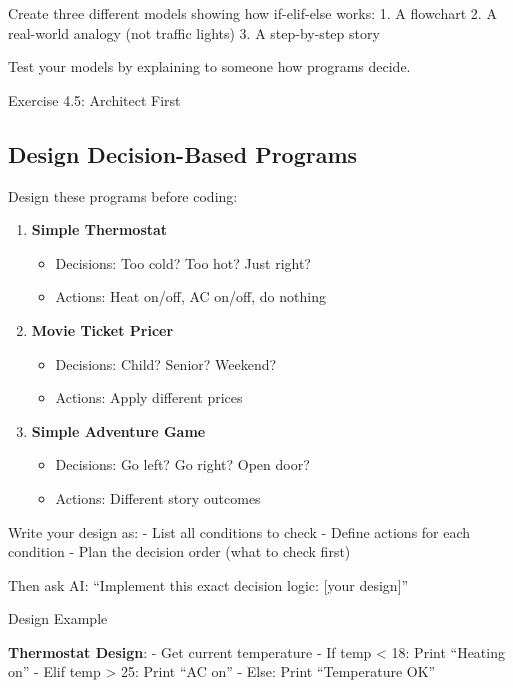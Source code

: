 \documentclass[
  letterpaper,
  DIV=11,
  numbers=noendperiod,
  oneside]{scrreprt}
\providecommand{\tightlist}{%
  \setlength{\itemsep}{0pt}\setlength{\parskip}{0pt}}\usepackage{longtable,booktabs,array}
\begin{document}
Create three different models showing how if-elif-else works: 1. A
flowchart 2. A real-world analogy (not traffic lights) 3. A step-by-step
story

Test your models by explaining to someone how programs decide.

Exercise 4.5: Architect First

\subsection{Design Decision-Based
Programs}\label{design-decision-based-programs}

Design these programs before coding:

\begin{enumerate}
\def\labelenumi{\arabic{enumi}.}
\tightlist
\item
  \textbf{Simple Thermostat}

  \begin{itemize}
  \tightlist
  \item
    Decisions: Too cold? Too hot? Just right?
  \item
    Actions: Heat on/off, AC on/off, do nothing
  \end{itemize}
\item
  \textbf{Movie Ticket Pricer}

  \begin{itemize}
  \tightlist
  \item
    Decisions: Child? Senior? Weekend?
  \item
    Actions: Apply different prices
  \end{itemize}
\item
  \textbf{Simple Adventure Game}

  \begin{itemize}
  \tightlist
  \item
    Decisions: Go left? Go right? Open door?
  \item
    Actions: Different story outcomes
  \end{itemize}
\end{enumerate}

Write your design as: - List all conditions to check - Define actions
for each condition - Plan the decision order (what to check first)

Then ask AI: ``Implement this exact decision logic: {[}your design{]}''

Design Example

\textbf{Thermostat Design}: - Get current temperature - If temp
\textless{} 18: Print ``Heating on'' - Elif temp \textgreater{} 25:
Print ``AC on'' - Else: Print ``Temperature OK''
\end{document}
